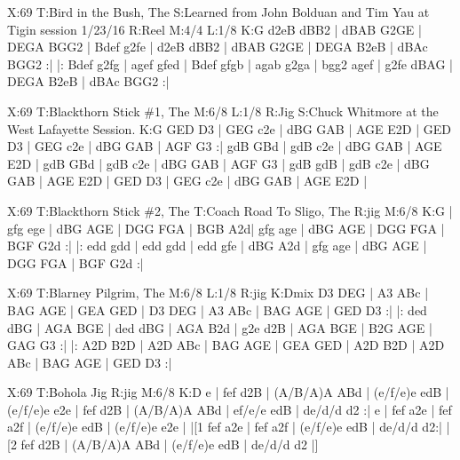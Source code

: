 \documentclass{article}
\begin{document}
\begin{abc}[name]
X:69
T:Bird in the Bush, The
S:Learned from John Bolduan and Tim Yau at Tigin session 1/23/16
R:Reel
M:4/4
L:1/8
K:G
d2eB dBB2 | dBAB G2GE | DEGA BGG2 | Bdef g2fe |
d2eB dBB2 | dBAB G2GE | DEGA B2eB | dBAc BGG2 :|
|: Bdef g2fg | agef gfed | Bdef gfgb | agab g2ga |
bgg2 agef | g2fe dBAG | DEGA B2eB | dBAc BGG2 :|
\end{abc}

\begin{abc}[name]
X:69
T:Blackthorn Stick \#1, The
M:6/8
L:1/8
R:Jig
S:Chuck Whitmore at the West Lafayette Session.
K:G
GED D3 | GEG c2e | dBG GAB | AGE E2D |
GED D3 | GEG c2e | dBG GAB | AGF G3 :|
gdB GBd | gdB c2e | dBG GAB | AGE E2D |
gdB GBd | gdB c2e | dBG GAB | AGF G3 |
gdB gdB | gdB c2e | dBG GAB | AGE E2D |
GED D3 | GEG c2e | dBG GAB | AGE E2D |
\end{abc}

\begin{abc}[name]
X:69
T:Blackthorn Stick \#2, The
T:Coach Road To Sligo, The
R:jig
M:6/8
K:G
| gfg ege | dBG AGE | DGG FGA | BGB A2d|
gfg age | dBG AGE | DGG FGA | BGF G2d :|
|: edd gdd | edd gdd | edd gfe | dBG A2d |
gfg age | dBG AGE | DGG FGA | BGF G2d :|
\end{abc}

\begin{abc}[name]
X:69
T:Blarney Pilgrim, The
M:6/8
L:1/8
R:jig
K:Dmix
D3 DEG | A3 ABc | BAG AGE | GEA GED |
D3 DEG | A3 ABc | BAG AGE | GED D3 :|
|: ded dBG | AGA BGE | ded dBG | AGA B2d |
g2e d2B | AGA BGE | B2G AGE | GAG G3 :|
|: A2D B2D | A2D ABc | BAG AGE | GEA GED |
A2D B2D | A2D ABc | BAG AGE | GED D3 :|
\end{abc}

\begin{abc}[name]
X:69
T:Bohola Jig
R:jig
M:6/8
K:D
e | fef d2B | (A/B/A)A ABd | (e/f/e)e edB | (e/f/e)e e2e |
fef d2B | (A/B/A)A ABd | ef/e/e edB | de/d/d d2 :|
e | fef a2e | fef a2f | (e/f/e)e edB | (e/f/e)e e2e |
|[1 fef a2e | fef a2f | (e/f/e)e edB | de/d/d d2:|
|[2 fef d2B | (A/B/A)A ABd | (e/f/e)e edB | de/d/d d2 |]
\end{abc}
\end{document}

